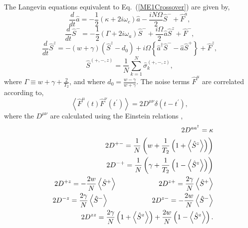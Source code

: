 \documentclass[aps,prl,twocolumn,
superscriptaddress,groupedaddress]{revtex4}
\begin{document}
The Langevin equations equivalent to Eq.~(\ref{ME1Crossover}) are given
by,
\begin{equation}
\frac{d}{dt} \hat{a}= -\frac{1}{2} (\kappa +2i\omega_c) \hat{a}
-\frac{i N \Omega}{2} \hat{S}^{-}
+\hat{F}^{a},
\label{La}
\end{equation}
\begin{equation}
\frac{d}{dt} \hat{S}^{-} =
-\frac{1}{2} \left(\Gamma +2 i \omega_a \right)  \hat{S}^{-}
+\frac{i \Omega}{2} \hat{a} \hat{S}^{z}
+\hat{F}^{-},
\label{Lsm}
\end{equation}
\begin{equation}
\frac{d}{dt} \hat{S}^{z} =
-(w+\gamma)\left( \hat{S}^{z} - d_0\right)
+i\Omega \left\{ \hat{a}^{\dagger}\hat{S}^{-} -
\hat{a}\hat{S}^{+} \right\}
+\hat{F}^{z},
\label{Lsz}
\end{equation}
\begin{equation}
\hat{S}^{(+,-,z)}=\frac{1}{N}\sum_{k=1}^N \hat{\sigma}_k^{(+,-,z)},
\nonumber
\end{equation}
where $\Gamma \equiv w+\gamma+\frac{2}{T_2}$, and where $d_0 =
\frac{w-\gamma}{w+\gamma}$. The noise terms $\hat F^\mu$ are correlated
according to,
\begin{equation}
\left< \hat{F}^{\mu}(t) \hat{F}^{\nu}(t^{\prime})\right> =
2 D^{\mu \nu} \delta(t-t^{\prime}),
\end{equation}
where the $D^{\mu \nu} $ are calculated using the Einstein relations
\cite{meystre2007elements},
\begin{eqnarray}
&& 2D^{a a^{\dagger}}= \kappa \nonumber \\
&& 2D^{+-}= \frac{1}{N}
\left(
  w + \frac{1}{T_2} \left(1 + \left< \hat{S}^{z} \right> \right)
\right) \nonumber \\
&& 2D^{-+}= \frac{1}{N}
\left(
  \gamma + \frac{1}{T_2} \left(1- \left< \hat{S}^{z} \right> \right)
\right) \nonumber \\
&& 2D^{+z}= -\frac{2w}{N} \left< \hat{S}^{+} \right>
\hspace{0.83in} 2D^{z+}= \frac{2\gamma}{N} \left< \hat{S}^{+} \right>
\nonumber \\
&& 2D^{-z}= \frac{2\gamma}{N} \left< \hat{S}^{-} \right>
\hspace{0.86in} 2D^{z-}= -\frac{2w}{N} \left< \hat{S}^{-} \right>
\nonumber \\
&& 2D^{zz}= \frac{2\gamma}{N}
\left(1+ \left< \hat{S}^{z} \right> \right) +
\frac{2w}{N}\left(1- \left< \hat{S}^{z} \right> \right).
\label{OpNoise1}
\end{eqnarray}
\end{document}
